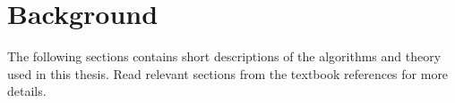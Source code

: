 \section{Background}
\label{sec:background}
The following sections contains short descriptions of the algorithms and theory used in this thesis.
Read relevant sections from the textbook references for more details.









